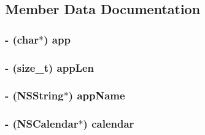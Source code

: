 \subsection{Member Data Documentation}
\hypertarget{interface_d_d_t_t_y_logger_aea8969e6e0fc04b775c1212139c669ea}{
\subsubsection[{app}]{\setlength{\rightskip}{0pt plus 5cm}-\/ (char$\ast$) app\hspace{0.3cm}{\ttfamily [protected]}}}\label{interface_d_d_t_t_y_logger_aea8969e6e0fc04b775c1212139c669ea}
\hypertarget{interface_d_d_t_t_y_logger_a1f9410c4ec61277fb56f5a85c57a4474}{
\subsubsection[{app\-Len}]{\setlength{\rightskip}{0pt plus 5cm}-\/ (size\-\_\-t) app\-Len\hspace{0.3cm}{\ttfamily [protected]}}}\label{interface_d_d_t_t_y_logger_a1f9410c4ec61277fb56f5a85c57a4474}
\hypertarget{interface_d_d_t_t_y_logger_a9f54836505cd04fe3205fc4b0419fd4d}{
\subsubsection[{app\-Name}]{\setlength{\rightskip}{0pt plus 5cm}-\/ (N\-S\-String$\ast$) app\-Name\hspace{0.3cm}{\ttfamily [protected]}}}\label{interface_d_d_t_t_y_logger_a9f54836505cd04fe3205fc4b0419fd4d}
\hypertarget{interface_d_d_t_t_y_logger_a4ee6e8d3042ae5d175a768a4e5c53c09}{
\subsubsection[{calendar}]{\setlength{\rightskip}{0pt plus 5cm}-\/ (N\-S\-Calendar$\ast$) calendar\hspace{0.3cm}{\ttfamily [protected]}}}\label{interface_d_d_t_t_y_logger_a4ee6e8d3042ae5d175a768a4e5c53c09}
